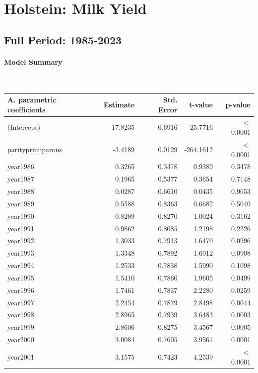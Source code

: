 \section{Holstein: Milk Yield}
\subsection{Full Period: 1985-2023}\label{model:ho_milk_full}
\paragraph{Model Summary} \quad \\

    \begin{table}[H]
    \centering
    \begin{tabular}{lrrrr}
    \textbf{A. parametric coefficients} & Estimate & Std. Error & t-value & p-value \\ 
       \hline
       \hline
  (Intercept) & 17.8235 & 0.6916 & 25.7716 & $<$ 0.0001 \\ 
  parityprimiparous & -3.4189 & 0.0129 & -264.1612 & $<$ 0.0001 \\ 
  year1986 & 0.3265 & 0.3478 & 0.9389 & 0.3478 \\ 
  year1987 & 0.1965 & 0.5377 & 0.3654 & 0.7148 \\ 
  year1988 & 0.0287 & 0.6610 & 0.0435 & 0.9653 \\ 
  year1989 & 0.5588 & 0.8363 & 0.6682 & 0.5040 \\ 
  year1990 & 0.8289 & 0.8270 & 1.0024 & 0.3162 \\ 
  year1991 & 0.9862 & 0.8085 & 1.2198 & 0.2226 \\ 
  year1992 & 1.3033 & 0.7913 & 1.6470 & 0.0996 \\ 
  year1993 & 1.3348 & 0.7892 & 1.6912 & 0.0908 \\ 
  year1994 & 1.2533 & 0.7838 & 1.5990 & 0.1098 \\ 
  year1995 & 1.5410 & 0.7860 & 1.9605 & 0.0499 \\ 
  year1996 & 1.7461 & 0.7837 & 2.2280 & 0.0259 \\ 
  year1997 & 2.2454 & 0.7879 & 2.8498 & 0.0044 \\ 
  year1998 & 2.8965 & 0.7939 & 3.6483 & 0.0003 \\ 
  year1999 & 2.8606 & 0.8275 & 3.4567 & 0.0005 \\ 
  year2000 & 3.0084 & 0.7605 & 3.9561 & 0.0001 \\ 
  year2001 & 3.1575 & 0.7423 & 4.2539 & $<$ 0.0001 \\ 

\end{tabular}
\end{table}

